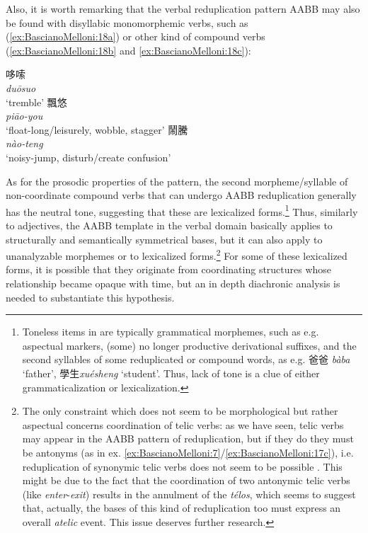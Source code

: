 \documentclass[output=paper]{langsci/langscibook}
\begin{document}
Also, it is worth remarking that the verbal reduplication pattern AABB
may also be found with disyllabic monomorphemic verbs, such as (\ref{ex:BascianoMelloni:18a}) or
other kind of compound verbs (\ref{ex:BascianoMelloni:18b} and \ref{ex:BascianoMelloni:18c}):

\ea\label{ex:BascianoMelloni:18}
\ea\label{ex:BascianoMelloni:18a} \gll 哆嗦 \\ \emph{duōsuo} \\ \glt `tremble'
\ex\label{ex:BascianoMelloni:18b} \gll 飄悠 \\ \emph{piāo-you} \\ \glt `float-long/leisurely, wobble, stagger'
\ex\label{ex:BascianoMelloni:18c} \gll 鬧騰 \\ \emph{nào-teng} \\ \glt `noisy-jump, disturb/create confusion'
\z\z

As for the prosodic properties of the pattern, the second
morpheme/syllable of non-coordinate compound verbs that can undergo AABB
reduplication generally has the neutral tone, suggesting that these are
lexicalized forms.\footnote{Toneless items in  are typically
  grammatical morphemes, such as e.g. aspectual markers, (some) no
  longer productive derivational suffixes, and the second syllables of
  some reduplicated or compound words, as e.g. 爸爸 \emph{bàba}
  `father', 學生\emph{xuésheng} `student'. Thus, lack of tone is a clue
  of either grammaticalization or lexicalization.} Thus, similarly to
adjectives, the AABB template in the verbal domain basically applies to
structurally and semantically symmetrical bases, but it can also apply
to unanalyzable morphemes or to lexicalized forms.\footnote{The only
  constraint which does not seem to be morphological but rather
  aspectual concerns coordination of telic verbs: as we have seen, telic
  verbs may appear in the AABB pattern of reduplication, but if they do
  they must be antonyms (as in ex. \ref{ex:BascianoMelloni:7}/\ref{ex:BascianoMelloni:17c}), i.e. reduplication of
  synonymic telic verbs does not seem to be possible %
\citep[see][]{Zhang2016}%
%
.
  This might be due to the fact that the coordination of two antonymic
  telic verbs (like \emph{enter}-\emph{exit}) results in the annulment
  of the \emph{télos}, which seems to suggest that, actually, the bases
  of this kind of reduplication too must express an overall
  \emph{atelic} event. This issue deserves further research.} For some
of these lexicalized forms, it is possible that they originate from
coordinating structures whose relationship became opaque with time, but
an in depth diachronic analysis is needed to substantiate this
hypothesis.
\end{document}

